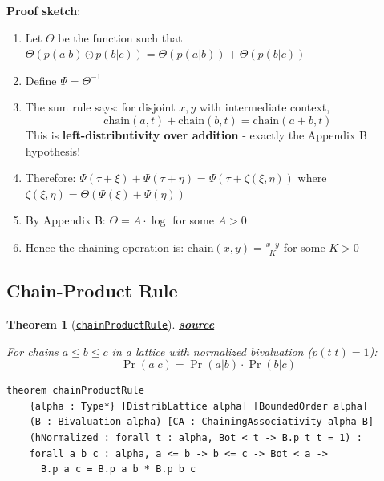 \documentclass[11pt]{article}
\newtheorem{theorem}{Theorem}[section]
\theoremstyle{definition}
\theoremstyle{remark}
\begin{document}
\textbf{Proof sketch}:
\begin{enumerate}
\item Let $\Theta$ be the function such that $\Theta(p(a|b) \odot p(b|c)) = \Theta(p(a|b)) + \Theta(p(b|c))$
\item Define $\Psi = \Theta^{-1}$
\item The sum rule says: for disjoint $x, y$ with intermediate context,
\[ \text{chain}(a, t) + \text{chain}(b, t) = \text{chain}(a+b, t) \]
This is \textbf{left-distributivity over addition} - exactly the Appendix B hypothesis!
\item Therefore: $\Psi(\tau + \xi) + \Psi(\tau + \eta) = \Psi(\tau + \zeta(\xi, \eta))$ where $\zeta(\xi,\eta) = \Theta(\Psi(\xi) + \Psi(\eta))$
\item By Appendix B: $\Theta = A \cdot \log$ for some $A > 0$
\item Hence the chaining operation is: $\text{chain}(x, y) = \frac{x \cdot y}{K}$ for some $K > 0$
\end{enumerate}

\subsection{Chain-Product Rule}

\begin{theorem}[\href{https://github.com/zariuq/ks-foundations-of-inference/blob/main/KnuthSkilling/Probability/ConditionalProbability/Basic.lean}{\texttt{chainProductRule}}]
\textbf{\href{https://github.com/zariuq/ks-foundations-of-inference/blob/main/KnuthSkilling/Probability/ConditionalProbability/Basic.lean}{source}}

For chains $a \leq b \leq c$ in a lattice with normalized bivaluation ($p(t|t) = 1$):
\[ \Pr(a|c) = \Pr(a|b) \cdot \Pr(b|c) \]
\end{theorem}

\begin{lstlisting}[caption={\texttt{chainProductRule} (\href{https://github.com/zariuq/ks-foundations-of-inference/blob/main/KnuthSkilling/Probability/ConditionalProbability/Basic.lean}{Basic.lean})},numbers=none]
theorem chainProductRule
    {alpha : Type*} [DistribLattice alpha] [BoundedOrder alpha]
    (B : Bivaluation alpha) [CA : ChainingAssociativity alpha B]
    (hNormalized : forall t : alpha, Bot < t -> B.p t t = 1) :
    forall a b c : alpha, a <= b -> b <= c -> Bot < a ->
      B.p a c = B.p a b * B.p b c
\end{lstlisting}
\end{document}
